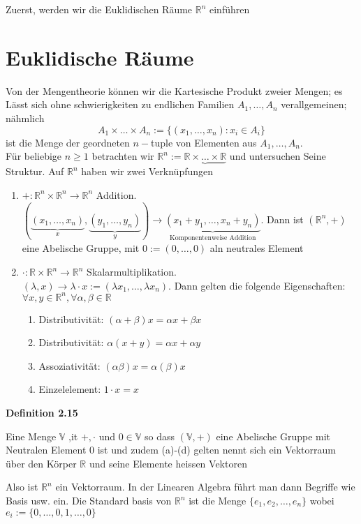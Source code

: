 \noindent Zuerst, werden wir die Euklidischen Räume $\mathbb{R}^n$ einführen
\section{Euklidische Räume}
Von der Mengentheorie können wir die Kartesische Produkt zweier Mengen; es Lässt sich ohne schwierigkeiten zu endlichen Familien $A_1,\dots ,A_n$ verallgemeinen; nähmlich $$A_1\times\dots\times A_n:=\{\left(x_1,\dots ,x_n\right):x_i\in A_i \}$$ ist die Menge der geordneten $n-$tuple von Elementen aus $A_1,\dots ,A_n$.\\

Für beliebige $n\geq 1$ betrachten wir $\mathbb{R}^n:=\underbrace{\mathbb{R}\times\dots\times\mathbb{R}}$  und untersuchen Seine Struktur. Auf $\mathbb{R}^n$ haben wir zwei Verknüpfungen
\begin{enumerate}
    \item $+:\mathbb{R}^n\times\mathbb{R}^n\rightarrow\mathbb{R}^n$ Addition.\\
$\left( {\underbrace {\left( {{x_1}, \ldots ,{x_n}} \right)}_x,\underbrace {\left( {{y_1}, \ldots ,{y_n}} \right)}_y} \right) \to \underbrace {\left( {{x_1} + {y_1}, \ldots ,{x_n} + {y_n}} \right)}_{{\text{Komponentenweise Addition}}}$. Dann ist $\left( \mathbb{R}^n,+\right)$ eine Abelische Gruppe, mit $0:=(0,\dots,0)$ aln neutrales Element
\item $\cdot:\mathbb{R}\times\mathbb{R}^n\rightarrow\mathbb{R}^n$ Skalarmultiplikation.\\
$(\lambda,x)\rightarrow\lambda\cdot x:=(\lambda x_1,\dots,\lambda x_n)$. Dann gelten die folgende Eigenschaften: $\forall x,y\in\mathbb{R}^n,\forall \alpha,\beta\in\mathbb{R}$ 
\begin{enumerate}
\item Distributivität: $\left( \alpha+\beta\right) x=\alpha x+\beta x$
\item Distributivität: $\alpha\left(x+y\right) = \alpha x+\alpha y$
\item Assoziativität: $\left( \alpha\beta\right) x=\alpha\left( \beta\right) x$
\item Einzelelement: $1\cdot x=x$
\end{enumerate}
\end{enumerate}

\begin{framed}
\centerline{\textbf{Definition 2.15}}
\noindent Eine Menge $\mathbb{V}$ ,it $+,\cdot$ und $0\in\mathbb{V}$ so dass $\left(\mathbb{V},+\right)$ eine Abelische Gruppe mit Neutralen Element 0 ist und zudem (a)-(d) gelten nennt sich ein Vektorraum über den Körper $\mathbb{R}$ und seine Elemente heissen Vektoren
\end{framed}
Also ist $\mathbb{R}^n$ ein Vektorraum. In der Linearen Algebra führt man dann Begriffe wie Basis usw. ein. Die Standard basis von $\mathbb{R}^n$ ist die Menge $\{e_1,e_2,\dots,e_n \}$ wobei $e_i:=\{0,\dots,0,1,\dots,0\}$ \\

